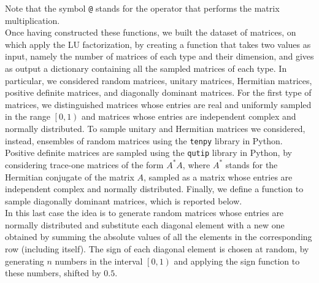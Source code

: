 \documentclass[a4paper,11pt]{article}
\begin{document}
\noindent Note that the symbol \texttt{@} stands for the operator that performs the matrix multiplication.\\

\noindent Once having constructed these functions, we built the dataset of matrices, on which apply the LU factorization, by creating a function that takes two values as input, namely the number of matrices of each type and their dimension, and gives as output a dictionary containing all the sampled matrices of each type. In particular, we considered random matrices, unitary matrices, Hermitian matrices, positive definite matrices, and diagonally dominant matrices. For the first type of matrices, we distinguished matrices whose entries are real and uniformly sampled in the range $\left[0,1\right)$ and matrices whose entries are independent complex and normally distributed. To sample unitary and Hermitian matrices we considered, instead, ensembles of random matrices using the \texttt{tenpy} library in Python. Positive definite matrices are sampled using the \texttt{qutip} library in Python, by considering trace-one matrices of the form $A^{*}A$, where $A^{*}$ stands for the Hermitian conjugate of the matrix $A$, sampled as a matrix whose entries are independent complex and normally distributed. Finally, we define a function to sample diagonally dominant matrices, which is reported below.\\

\noindent In this last case the idea is to generate random matrices whose entries are normally distributed and substitute each diagonal element with a new one obtained by summing the absolute values of all the elements in the corresponding row (including itself). The sign of each diagonal element is chosen at random, by generating $n$ numbers in the interval $\left[0,1\right)$ and applying the sign function to these numbers, shifted by $0.5$.
\end{document}

